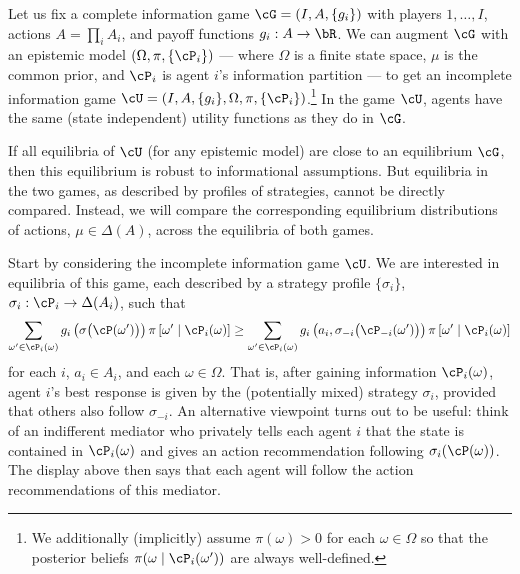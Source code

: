 Let us fix a complete information game \(\cG = (I, A, \{g_i\})\) with players \(1, \dots, I\), actions \(A = \prod_i A_i\), and payoff functions \(g_i: A \to \bR\).
We can augment \(\cG\) with an epistemic model \((\Omega, \pi, \{\cP_i\})\) --- where \(\Omega\) is a finite state space, \(\mu\) is the common prior, and \(\cP_i\) is agent \(i\)'s information partition --- to get an incomplete information game \(\cU = (I, A, \{g_i\}, \Omega, \pi, \{\cP_i\})\).\footnote{We additionally (implicitly) assume \(\pi(\omega) > 0\) for each \(\omega \in \Omega\) so that the posterior beliefs \(\pi(\omega \mid \cP_i(\omega'))\) are always well-defined.}
In the game \(\cU\), agents have the same (state independent) utility functions as they do in \(\cG\).

If all equilibria of \(\cU\) (for any epistemic model) are close to an equilibrium \(\cG\), then this equilibrium is robust to informational assumptions.
But equilibria in the two games, as described by profiles of strategies, cannot be directly compared.
Instead, we will compare the corresponding equilibrium distributions of actions, \(\mu \in \Delta(A)\), across the equilibria of both games.


Start by considering the incomplete information game \(\cU\).
We are interested in  equilibria of this game, each described by a strategy profile \(\{\sigma_i\}\), \(\sigma_i: \cP_i \to \Delta(A_i)\), such that
\[
  \sum_{\omega' \in \cP_i(\omega)} g_i\left( \sigma\big(\cP(\omega')\big) \right) \pi\left[ \omega' \mid \cP_i(\omega) \right]
  \geq \sum_{\omega' \in \cP_i(\omega)} g_i\left( a_i, \sigma_{-i}\big(\cP_{-i}(\omega')\big) \right) \pi\left[ \omega' \mid \cP_i(\omega) \right]
\]
for each \(i\), \(a_i \in A_i\), and each \(\omega \in \Omega\).
That is, after gaining information \(\cP_i(\omega)\), agent \(i\)'s best response is given by the (potentially mixed) strategy \(\sigma_i\), provided that others also follow \(\sigma_{-i}\).
An alternative viewpoint turns out to be useful: think of an indifferent mediator who privately tells each agent \(i\) that the state is contained in \(\cP_i(\omega)\) and gives an action recommendation following \(\sigma_i(\cP(\omega))\).
The display above then says that each agent will follow the action recommendations of this mediator.

